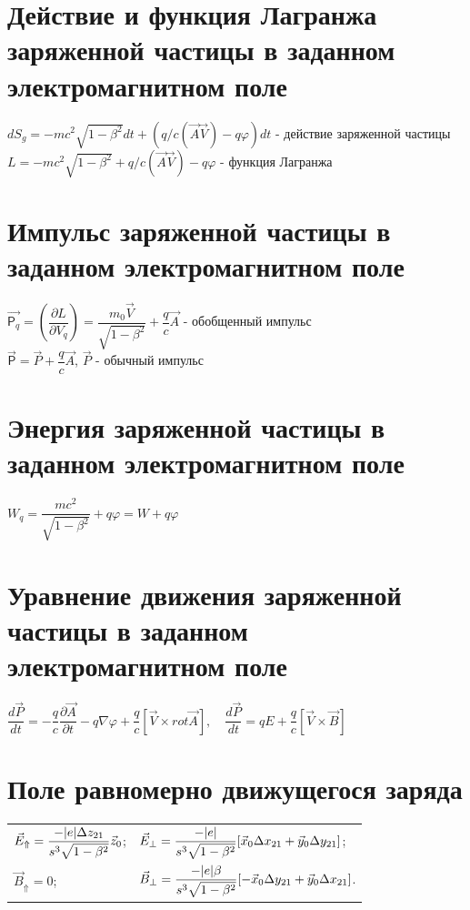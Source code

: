 \begin{multicols*}{2}
	
		\section{Действие и функция Лагранжа заряженной частицы в заданном электромагнитном поле}
		$dS_g = -mc^2\sqrt{1-\beta^2} dt + (q/c(\vec{A}\vec{V}) - q\varphi)dt$ - действие заряженной частицы\\
		$L = -mc^2\sqrt{1-\beta^2} + q/c(\vec{A}\vec{V}) - q\varphi$ - функция Лагранжа
		
		\section{Импульс заряженной частицы в заданном электромагнитном поле}
		$\vec{\mathsf{P}_q} = (\dfrac{\partial L}{\partial V_q}) = \dfrac{m_0\vec{V}}{\sqrt{1-\beta^2}} + \dfrac{q}{c}\vec{A}$ - обобщенный импульс\\
		$\vec{\mathsf{P}} = \vec{P} + \dfrac{q}{c}\vec{A}$, \quad $\vec{P}$ - обычный импульс
		
		\section{Энергия заряженной частицы в заданном электромагнитном поле}
		$W_q = \dfrac{mc^2}{\sqrt{1-\beta^2}} + q\varphi = W + q\varphi$
		
		\section{Уравнение движения заряженной частицы в заданном электромагнитном поле}
		$\dfrac{d\vec{P}}{dt} = -\dfrac{q}{c}\dfrac{\partial \vec{A}}{\partial t} - q\nabla \varphi + \dfrac{q}{c}\left[\vec{V}\times rot\vec{A}\right], \quad \dfrac{d\vec{P}}{dt} = qE + \dfrac{q}{c}\left[\vec{V}\times \vec{B}\right] $
		
		\section{Поле равномерно движущегося заряда}
		\begin{tabular}{l l}
			$\vec E_\Uparrow = \dfrac{-\abs{e}\Delta z_{21}}{s^3\sqrt{1-\beta^2}}\vec{z}_0$; &
			$\vec E_\perp = \dfrac{-\abs{e}}{s^3\sqrt{1-\beta^2}}[\vec{x}_0\Delta x_{21}+\vec{y}_0 \Delta y_{21}]$; \\$\vec B_\Uparrow = 0$; &
			$\vec B_\perp = \dfrac{-\abs{e}\beta}{s^3\sqrt{1-\beta^2}}[-\vec{x}_0\Delta y_{21}+\vec{y}_0 \Delta x_{21}]$.
		\end{tabular}
		

\end{multicols*}
